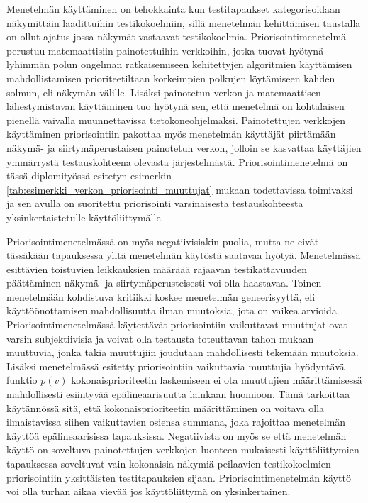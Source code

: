   Menetelmän käyttäminen on tehokkainta kun testitapaukset kategorisoidaan näkymittäin laadittuihin testikokoelmiin, sillä menetelmän kehittämisen taustalla on ollut ajatus jossa näkymät vastaavat testikokoelmia.
  Priorisointimenetelmä perustuu matemaattisiin painotettuihin verkkoihin, jotka tuovat hyötynä lyhimmän polun ongelman ratkaisemiseen kehitettyjen algoritmien käyttämisen mahdollistamisen prioriteetiltaan korkeimpien polkujen löytämiseen kahden solmun, eli näkymän välille.
  Lisäksi painotetun verkon ja matemaattisen lähestymistavan käyttäminen tuo hyötynä sen, että menetelmä on kohtalaisen pienellä vaivalla muunnettavissa tietokoneohjelmaksi.
  Painotettujen verkkojen käyttäminen priorisointiin pakottaa myös menetelmän käyttäjät piirtämään näkymä- ja siirtymäperustaisen painotetun verkon, jolloin se kasvattaa käyttäjien ymmärrystä testauskohteena olevasta järjestelmästä.
  Priorisointimenetelmä on tässä diplomityössä esitetyn esimerkin \ref{tab:esimerkki_verkon_priorisointi_muuttujat} mukaan todettavissa toimivaksi ja sen avulla on suoritettu priorisointi varsinaisesta testauskohteesta yksinkertaistetulle käyttöliittymälle.

  Priorisointimenetelmässä on myös negatiivisiakin puolia, mutta ne eivät tässäkään tapauksessa ylitä menetelmän käytöstä saatavaa hyötyä.
  Menetelmässä esittävien toistuvien leikkauksien määräää rajaavan testikattavuuden päättäminen näkymä- ja siirtymäperusteisesti voi olla haastavaa.
  Toinen menetelmään kohdistuva kritiikki koskee menetelmän geneerisyyttä, eli käyttöönottamisen mahdollisuutta ilman muutoksia, jota on vaikea arvioida.
  Priorisointimenetelmässä käytettävät priorisointiin vaikuttavat muuttujat ovat varsin subjektiivisia ja voivat olla testausta toteuttavan tahon mukaan muuttuvia, jonka takia muuttujiin joudutaan mahdollisesti tekemään muutoksia.
  Lisäksi menetelmässä esitetty priorisointiin vaikuttavia muuttujia hyödyntävä funktio \(p(v)\) kokonaisprioriteetin laskemiseen ei ota muuttujien määrittämisessä mahdollisesti esiintyvää epälineaarisuutta lainkaan huomioon.
  Tämä tarkoittaa käytännössä sitä, että kokonaisprioriteetin määrittäminen on voitava olla ilmaistavissa siihen vaikuttavien osiensa summana, joka rajoittaa menetelmän käyttöä epälineaarisissa tapauksissa.
  Negatiivista on myös se että menetelmän käyttö on soveltuva painotettujen verkkojen luonteen mukaisesti käyttöliittymien tapauksessa soveltuvat vain kokonaisia näkymiä peilaavien testikokoelmien priorisointiin yksittäisten testitapauksien sijaan.
  Priorisointimenetelmän käyttö voi olla turhan aikaa vievää jos käyttöliittymä on yksinkertainen.


